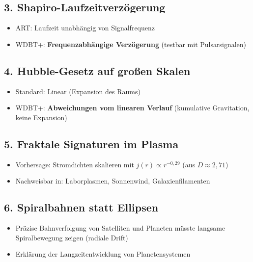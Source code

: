 \documentclass[12pt,a4paper]{article}
\begin{document}
\subsection*{3. Shapiro-Laufzeitverzögerung}
\begin{itemize}
    \item ART: Laufzeit unabhängig von Signalfrequenz
    \item WDBT+: \textbf{Frequenzabhängige Verzögerung} (testbar mit Pulsarsignalen)
\end{itemize}

\subsection*{4. Hubble-Gesetz auf großen Skalen}
\begin{itemize}
    \item Standard: Linear (Expansion des Raums)
    \item WDBT+: \textbf{Abweichungen vom linearen Verlauf} (kumulative Gravitation, keine Expansion)
\end{itemize}

\subsection*{5. Fraktale Signaturen im Plasma}
\begin{itemize}
    \item Vorhersage: Stromdichten skalieren mit \textbf{$j(r) \propto r^{-0{,}29}$} (aus $D \approx 2{,}71$)
    \item Nachweisbar in: Laborplasmen, Sonnenwind, Galaxienfilamenten
\end{itemize}

\subsection*{6. Spiralbahnen statt Ellipsen}
\begin{itemize}
    \item Präzise Bahnverfolgung von Satelliten und Planeten müsste langsame Spiralbewegung zeigen (radiale Drift)
    \item Erklärung der Langzeitentwicklung von Planetensystemen
\end{itemize}
\end{document}
